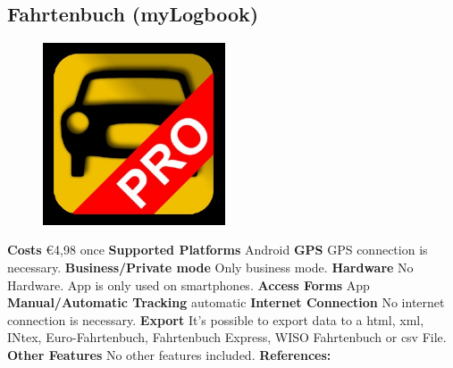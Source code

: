 \begin{singlespace}
\section{Fahrtenbuch (myLogbook)}
\begin{figure}
  \begin{center}
    \includegraphics[width=0.48\textwidth]{bilder/fahrtenbuch2}
  \end{center}
\end{figure}
\textbf{Costs} \euro 4,98 once
\newline\newline
\textbf{Supported Platforms} Android 
\newline\newline
\textbf{GPS} GPS connection is necessary.
\newline\newline
\textbf{Business/Private mode} Only business mode.
\newline\newline
\textbf{Hardware} No Hardware. App is only used on smartphones.
\newline\newline
\textbf{Access Forms} App
\newline\newline
\textbf{Manual/Automatic Tracking} automatic
\newline\newline
\textbf{Internet Connection} No internet connection is necessary.
\newline\newline
\textbf{Export} It’s possible to export data to a \gls{html}, \gls{xml}, INtex, Euro-Fahrtenbuch, Fahrtenbuch Express, WISO Fahrtenbuch or \gls{csv} File.
\newline\newline
\textbf{Other Features} No other features included.
\newline\newline
\textbf{References:} \cite{Fahrtenbuch_myLogbook}
\newpage


\end{singlespace}
